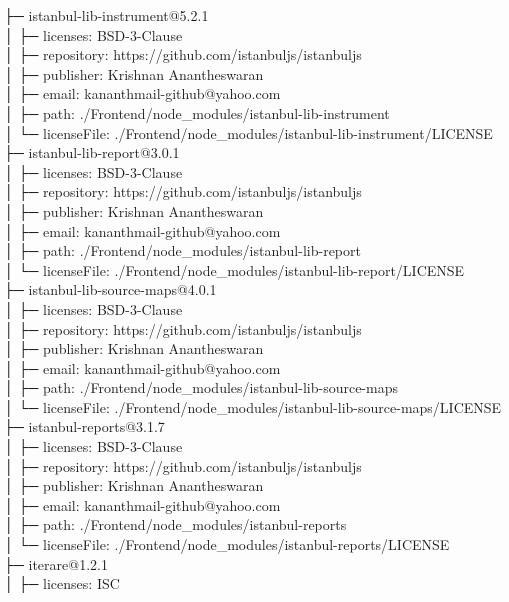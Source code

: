 ├─ istanbul-lib-instrument@5.2.1\\
│  ├─ licenses: BSD-3-Clause\\
│  ├─ repository: https://github.com/istanbuljs/istanbuljs\\
│  ├─ publisher: Krishnan Anantheswaran\\
│  ├─ email: kananthmail-github@yahoo.com\\
│  ├─ path: ./Frontend/node\_modules/istanbul-lib-instrument\\
│  └─ licenseFile: ./Frontend/node\_modules/istanbul-lib-instrument/LICENSE\\
├─ istanbul-lib-report@3.0.1\\
│  ├─ licenses: BSD-3-Clause\\
│  ├─ repository: https://github.com/istanbuljs/istanbuljs\\
│  ├─ publisher: Krishnan Anantheswaran\\
│  ├─ email: kananthmail-github@yahoo.com\\
│  ├─ path: ./Frontend/node\_modules/istanbul-lib-report\\
│  └─ licenseFile: ./Frontend/node\_modules/istanbul-lib-report/LICENSE\\
├─ istanbul-lib-source-maps@4.0.1\\
│  ├─ licenses: BSD-3-Clause\\
│  ├─ repository: https://github.com/istanbuljs/istanbuljs\\
│  ├─ publisher: Krishnan Anantheswaran\\
│  ├─ email: kananthmail-github@yahoo.com\\
│  ├─ path: ./Frontend/node\_modules/istanbul-lib-source-maps\\
│  └─ licenseFile: ./Frontend/node\_modules/istanbul-lib-source-maps/LICENSE\\
├─ istanbul-reports@3.1.7\\
│  ├─ licenses: BSD-3-Clause\\
│  ├─ repository: https://github.com/istanbuljs/istanbuljs\\
│  ├─ publisher: Krishnan Anantheswaran\\
│  ├─ email: kananthmail-github@yahoo.com\\
│  ├─ path: ./Frontend/node\_modules/istanbul-reports\\
│  └─ licenseFile: ./Frontend/node\_modules/istanbul-reports/LICENSE\\
├─ iterare@1.2.1\\
│  ├─ licenses: ISC\\
